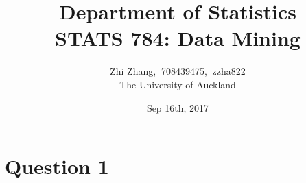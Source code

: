 \documentclass{article}%
\begin{document}
\title{Department of  Statistics \\ STATS 784: Data Mining}
\author{Zhi Zhang, $\ $708439475, $\ $zzha822
\\The University of Auckland}
\date{Sep 16th, 2017}
\maketitle


\section{Question 1}
\end{document}
